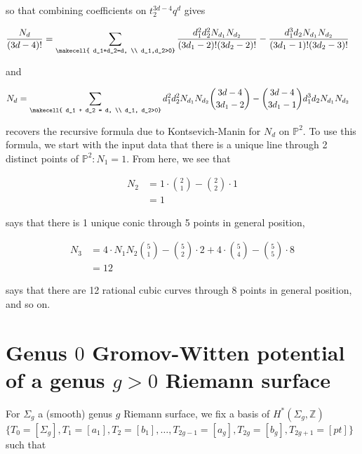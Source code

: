 \documentclass{amsart}
\newcommand{\PP}{\mathbb{P}}\newcommand{\A}{\mathbb{A}}\newcommand{\Z}{\mathbb{Z}}\newcommand{\C}{\mathbb{C}}\newcommand{\N}{\mathbb{N}}\newcommand{\T}{\mathbb{T}}
\begin{document}
so that combining coefficients on $t_2^{3d-4}q^d$ gives 

\begin{align*}
    \frac{N_d}{(3d-4)!} &= \sum_{ \makecell{ d_1+d_2=d, \\ d_1,d_2>0}} \frac{d_1^2d_2^2 N_{d_1}N_{d_2}}{(3d_1-2)!(3d_2-2)!} - \frac{d_1^3 d_2 N_{d_1} N_{d_2}}{(3d_1-1)!(3d_2-3)!} 
\end{align*}

and

\begin{align*}
N_d &= \sum_{ \makecell{ d_1 + d_2 = d, \\ d_1, d_2>0} } d_1^2 d_2^2 N_{d_1} N_{d_2} \binom{3d-4}{3d_1-2} - \binom{3d-4}{3d_1-1} d_1^3 d_2 N_{d_1} N_{d_2} 
\end{align*}

recovers the recursive formula due to Kontsevich-Manin \cite{KontsevichManin_1994} for $N_d$ on $\PP^2$. To use this formula, we start with the input data that there is a unique line through 2 distinct points of $\PP^2: N_1=1$. From here, we see that 

\begin{align*}
    N_2 &= 1\cdot \binom{2}{1} - \binom{2}{2}\cdot 1 \\
    &= 1 \end{align*}

says that there is 1 unique conic through 5 points in general position,


    \begin{align*}
    N_3 &= 4 \cdot N_1 N_2 \binom{5}{1} - \binom{5}{2}\cdot 2 + 4\cdot \binom{5}{4} - \binom{5}{5} \cdot 8\\
    &= 12
\end{align*}

says that there are 12 rational cubic curves through 8 points in general position, and so on. 





\section{Genus $0$ Gromov-Witten potential of a genus $g>0$ Riemann surface}

For $\Sigma_g$ a (smooth) genus $g$ Riemann surface, we fix a basis of $H^*(\Sigma_g, \Z)$ $\{ T_0= [\Sigma_g], T_1 = [a_1], T_2 =[b_1], \dots, T_{2g-1} = [a_g], T_{2g} = [b_g], T_{2g+1} = [pt]\}$ such that 
\end{document}
